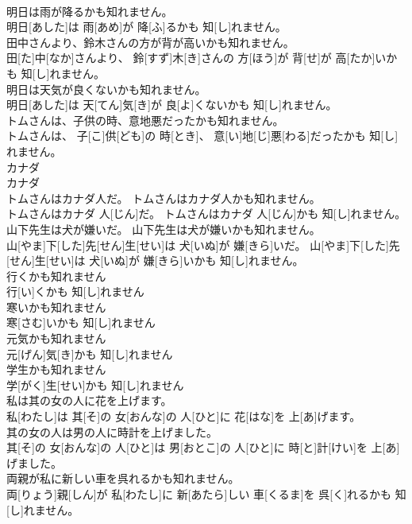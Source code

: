 \documentclass[8pt]{extreport}
\begin{document}
\begin{CJK}{UTF8}{min}
\\	明日は雨が降るかも知れません。	
\\	明日[あした]は 雨[あめ]が 降[ふ]るかも 知[し]れません。
\\	田中さんより、鈴木さんの方が背が高いかも知れません。	
\\	田[た]中[なか]さんより、 鈴[すず]木[き]さんの 方[ほう]が 背[せ]が 高[たか]いかも 知[し]れません。
\\	明日は天気が良くないかも知れません。	
\\	明日[あした]は 天[てん]気[き]が 良[よ]くないかも 知[し]れません。
\\	トムさんは、子供の時、意地悪だったかも知れません。	
\\	トムさんは、 子[こ]供[ども]の 時[とき]、 意[い]地[じ]悪[わる]だったかも 知[し]れません。
\\	カナダ	
\\	カナダ	
\\	トムさんはカナダ人だ。 トムさんはカナダ人かも知れません。	
\\	トムさんはカナダ 人[じん]だ。 トムさんはカナダ 人[じん]かも 知[し]れません。
\\	山下先生は犬が嫌いだ。 山下先生は犬が嫌いかも知れません。	
\\	山[やま]下[した]先[せん]生[せい]は 犬[いぬ]が 嫌[きら]いだ。 山[やま]下[した]先[せん]生[せい]は 犬[いぬ]が 嫌[きら]いかも 知[し]れません。
\\	行くかも知れません	
\\	行[い]くかも 知[し]れません
\\	寒いかも知れません	
\\	寒[さむ]いかも 知[し]れません
\\	元気かも知れません	
\\	元[げん]気[き]かも 知[し]れません
\\	学生かも知れません	
\\	学[がく]生[せい]かも 知[し]れません
\\	私は其の女の人に花を上げます。	
\\	私[わたし]は 其[そ]の 女[おんな]の 人[ひと]に 花[はな]を 上[あ]げます。
\\	其の女の人は男の人に時計を上げました。	
\\	其[そ]の 女[おんな]の 人[ひと]は 男[おとこ]の 人[ひと]に 時[と]計[けい]を 上[あ]げました。
\\	両親が私に新しい車を呉れるかも知れません。	
\\	両[りょう]親[しん]が 私[わたし]に 新[あたら]しい 車[くるま]を 呉[く]れるかも 知[し]れません。

\end{CJK}
\end{document}
